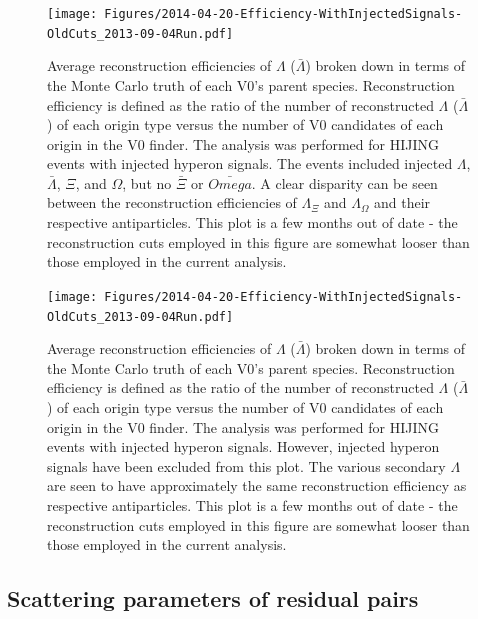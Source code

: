 \begin{figure}[hbtp]
\texttt{[image: Figures/2014-04-20-Efficiency-WithInjectedSignals-OldCuts\_2013-09-04Run.pdf]}
\caption[$Lambda$ reconstruction efficiencies with injected signals]{Average reconstruction efficiencies of $\Lambda$ ($\bar{\Lambda}$) broken down in terms of the Monte Carlo truth of each V0's parent species.  Reconstruction efficiency is defined as the ratio of the number of reconstructed $\Lambda$ ($\bar{\Lambda}$) of each origin type versus the number of V0 candidates of each origin in the V0 finder.  The analysis was performed for HIJING events with injected hyperon signals.  The events included injected $\Lambda$, $\bar{\Lambda}$, $\Xi$, and $\Omega$, but no $\bar{\Xi}$ or $\bar{Omega}$.  A clear disparity can be seen between the reconstruction efficiencies of $\Lambda_{\Xi}$ and $\Lambda_{\Omega}$ and their respective antiparticles.  This plot is a few months out of date - the reconstruction cuts employed in this figure are somewhat looser than those employed in the current analysis.}
\label{fig:MCEfficiencyWithInjected}
\end{figure}

\begin{figure}[hbtp]
\texttt{[image: Figures/2014-04-20-Efficiency-WithInjectedSignals-OldCuts\_2013-09-04Run.pdf]}
\caption[$Lambda$ reconstruction efficiencies without injected signals]{Average reconstruction efficiencies of $\Lambda$ ($\bar{\Lambda}$) broken down in terms of the Monte Carlo truth of each V0's parent species.  Reconstruction efficiency is defined as the ratio of the number of reconstructed $\Lambda$ ($\bar{\Lambda}$) of each origin type versus the number of V0 candidates of each origin in the V0 finder.  The analysis was performed for HIJING events with injected hyperon signals.  However, injected hyperon signals have been excluded from this plot.  The various secondary $\Lambda$ are seen to have approximately the same reconstruction efficiency as respective antiparticles.  This plot is a few months out of date - the reconstruction cuts employed in this figure are somewhat looser than those employed in the current analysis.}
\label{fig:MCEfficiencyNoInjected}
\end{figure}

\subsection{Scattering parameters of residual pairs}
\label{sec:ScatteringParams}

